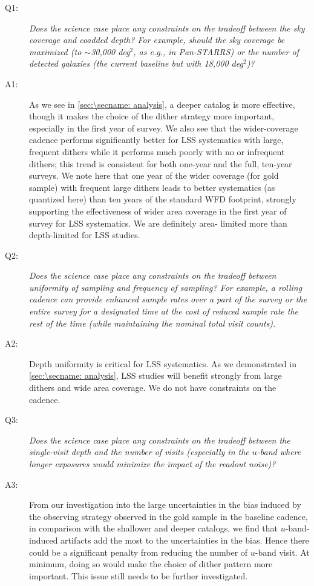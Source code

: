 \begin{description}

\item[Q1:] {\it Does the science case place any constraints on the
tradeoff between the sky coverage and coadded depth? For example, should
the sky coverage be maximized (to $\sim$30,000 deg$^2$, as e.g., in
Pan-STARRS) or the number of detected galaxies (the current baseline but
with 18,000 deg$^2$)?}

\item[A1:] As we see in \autoref{sec:\secname: analysis}, a deeper
catalog is more effective, though it makes the choice of the dither
strategy more important, especially in the first year of survey. We also see 
that the wider-coverage cadence  performs 
significantly better for LSS systematics with large, frequent dithers  
while it performs much poorly with no or infrequent dithers; this
trend is consistent for both one-year and the full, ten-year surveys. We
note here that one year of the wider coverage (for gold sample) with frequent large
dithers leads to better systematics (as quantized here) than ten years of 
the standard WFD  footprint, strongly supporting the effectiveness of wider area
coverage in the first year of survey for LSS systematics. We are definitely area-
limited more than depth-limited for LSS studies.

\item[Q2:] {\it Does the science case place any constraints on the
tradeoff between uniformity of sampling and frequency of  sampling? For
example, a rolling cadence can provide enhanced sample rates over a part
of the survey or the entire survey for a designated time at the cost of
reduced sample rate the rest of the time (while maintaining the nominal
total visit counts).}

\item[A2:] Depth uniformity is critical for LSS systematics. As we
demonstrated in \autoref{sec:\secname: analysis}, LSS studies will benefit
strongly from large dithers and wide area coverage. We do not have constraints
on the cadence.

\item[Q3:] {\it Does the science case place any constraints on the
tradeoff between the single-visit depth and the number of visits
(especially in the $u$-band where longer exposures would minimize the
impact of the readout noise)?}

\item[A3:] From our investigation into the large uncertainties in the bias induced by 
the observing strategy observed in the gold sample in the baseline cadence, in
comparison with the shallower and deeper catalogs, we find that
$u$-band-induced artifacts add the most to the uncertainties in the
bias. Hence there could be a significant penalty from reducing the
number of $u$-band visit. At minimum, doing so would make the choice of
dither pattern more important. This issue still needs to be further
investigated.


\end{description}
